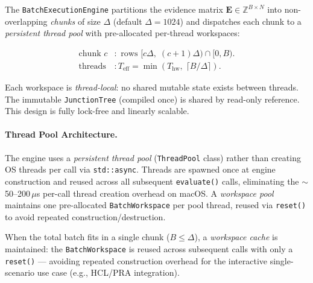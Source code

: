 \documentclass[11pt, letterpaper]{article}
\theoremstyle{definitionstyle}
\begin{document}
The \texttt{BatchExecutionEngine} partitions the evidence matrix
$\mathbf{E}\in\mathbb{Z}^{B\times N}$ into non-overlapping
\emph{chunks} of size $\Delta$ (default $\Delta = 1024$) and dispatches
each chunk to a \emph{persistent thread pool} with pre-allocated
per-thread workspaces:

\begin{align}
  \text{chunk } c &: \text{ rows } [c\Delta,\; (c{+}1)\Delta) \cap [0,B).\\
  \text{threads} &: T_{\text{eff}} = \min(T_{\text{hw}},\; \lceil B/\Delta\rceil).
\end{align}

\noindent
Each workspace is \emph{thread-local}: no shared mutable state exists
between threads. The immutable \texttt{JunctionTree} (compiled once) is
shared by read-only reference. This design is fully lock-free and
linearly scalable.

\paragraph{Thread Pool Architecture.}
The engine uses a \emph{persistent thread pool} (\texttt{ThreadPool} class)
rather than creating OS threads per call via \texttt{std::async}. Threads
are spawned once at engine construction and reused across all subsequent
\texttt{evaluate()} calls, eliminating the $\sim$50--200\,$\mu$s
per-call thread creation overhead on macOS. A \emph{workspace pool}
maintains one pre-allocated \texttt{BatchWorkspace} per pool thread,
reused via \texttt{reset()} to avoid repeated construction/destruction.

When the total batch fits in a single chunk ($B \leq \Delta$), a
\emph{workspace cache} is maintained: the \texttt{BatchWorkspace} is
reused across subsequent calls with only a \texttt{reset()} — avoiding
repeated construction overhead for the interactive single-scenario
use case (e.g., HCL/PRA integration).
\end{document}
